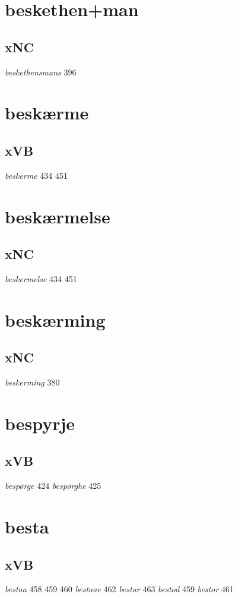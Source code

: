 \documentclass[a4paper,twocolumn]{article}
\begin{document}
\section{beskethen+man}
\label{sec:org6e7b7e0}
\subsection{xNC}
\label{sec:orgf1af7b2}
\emph{beskethensmans} 396 
\section{beskærme}
\label{sec:org9fc1500}
\subsection{xVB}
\label{sec:orgf1e8714}
\emph{beskerme} 434 451 
\section{beskærmelse}
\label{sec:org66f77b2}
\subsection{xNC}
\label{sec:org831f44b}
\emph{beskermelse} 434 451 
\section{beskærming}
\label{sec:orgf9bbbd7}
\subsection{xNC}
\label{sec:orgacbc73a}
\emph{beskerming} 380 
\section{bespyrje}
\label{sec:orga9a68a8}
\subsection{xVB}
\label{sec:orgb31ba5c}
\emph{bespørge} 424 \emph{bespørghe} 425 
\section{besta}
\label{sec:org91469a3}
\subsection{xVB}
\label{sec:org9616b94}
\emph{bestaa} 458 459 460 \emph{bestaae} 462 \emph{bestar} 463 \emph{bestod} 459 \emph{bestor} 461 
\end{document}
